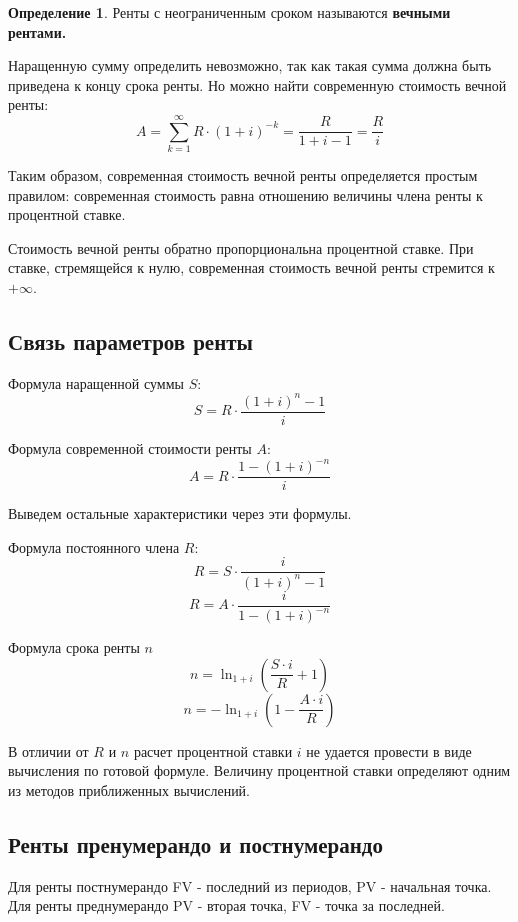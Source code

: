 \documentclass[aps,%
12pt,%
final,%
oneside,
onecolumn,%
musixtex, %
superscriptaddress,%
centertags]{article} %
\theoremstyle{plain}
\theoremstyle{definition}
\newtheorem{definition}{Определение}[subsection]
\theoremstyle{remark}
\begin{document}
\begin{definition}
	Ренты с неограниченным сроком называются \textbf{вечными рентами.}
\end{definition}

Наращенную сумму определить невозможно, так как такая сумма должна быть приведена к концу срока ренты. Но можно найти современную стоимость вечной ренты:
$$A = \sum\limits_{k=1}^{\infty} R \cdot (1+i)^{-k} = \frac{R}{1+i-1} = \frac{R}{i}$$

Таким образом, современная стоимость вечной ренты определяется простым правилом: современная стоимость равна отношению величины члена ренты к процентной ставке.

Стоимость вечной ренты обратно пропорциональна процентной ставке. При ставке, стремящейся к нулю, современная стоимость вечной ренты стремится к $+\infty$.


\subsection{Связь параметров ренты }

Формула наращенной суммы $S$:
$$ S = R \cdot \frac{(1+i)^n - 1 }{i} $$

Формула современной стоимости ренты $A$:
$$A = R \cdot \frac {1-(1+i)^{-n}}{i}$$

Выведем остальные характеристики через эти формулы.

Формула постоянного члена $R$:
$$ R = S \cdot \frac{i}{(1+i)^n - 1}$$
$$ R = A \cdot \frac {i}{1-(1+i)^{-n}}$$

Формула срока ренты $n$
$$ n = \ln_{1+i} \left(\frac{S \cdot i}{R} + 1 \right)$$
$$ n = -\ln_{1+i} \left(1 - \frac{A \cdot i}{R}  \right)$$

В отличии от $R$ и $n$ расчет процентной ставки $i$ не удается провести в виде вычисления по готовой формуле. Величину процентной ставки определяют одним из методов приближенных вычислений.


\subsection{Ренты пренумерандо и постнумерандо}

Для ренты постнумерандо FV - последний из периодов, PV - начальная точка. Для ренты преднумерандо PV - вторая точка, FV - точка за последней.
\end{document}
